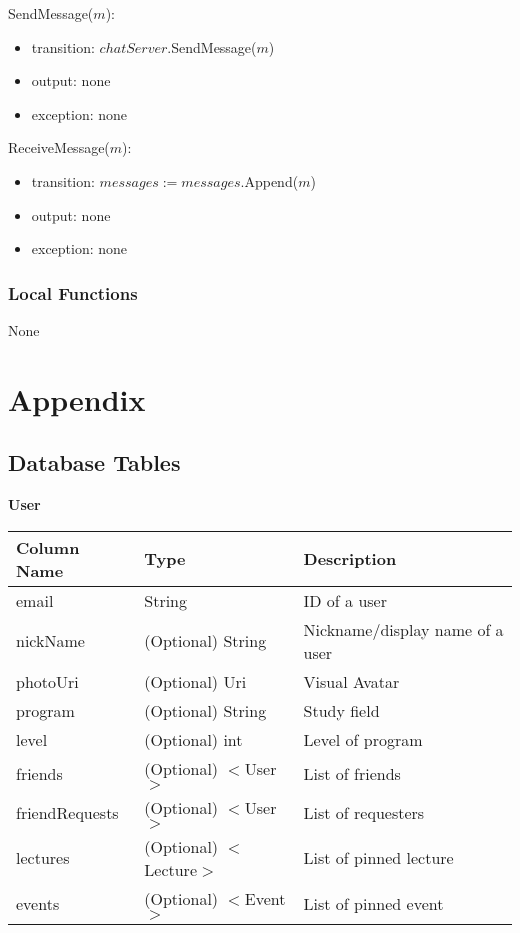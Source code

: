 \documentclass[12pt, titlepage]{article}
\begin{document}
\noindent SendMessage($m$):
\begin{itemize}
\item transition: $chatServer$.SendMessage($m$)
\item output: none
\item exception: none
\end{itemize}

\noindent ReceiveMessage($m$):
\begin{itemize}
\item transition: $messages := messages$.Append($m$)
\item output: none
\item exception: none
\end{itemize}

\subsubsection{Local Functions}

None

\newpage

\section{Appendix} \label{Appendix}
\subsection{Database Tables}

\quad \textbf{User}
\begin{table}[H]
	\begin{tabular}{|p{}|p{}|p{}|}
		\hline
		\textbf{Column Name} & \textbf{Type}  & \textbf{Description}                  \\
		\hline
		email                   & String                & ID of a user                        \\
		\hline
		nickName           & (Optional) String                & Nickname/display name of a user      \\
		\hline
		photoUri           & (Optional) Uri                & Visual Avatar       \\
		\hline
		program            & (Optional) String                & Study field                \\
		\hline
		level             & (Optional) int                & Level of program                 \\
		\hline
		friends          &  (Optional) $<$User$>$                & List of friends \\
		\hline
		friendRequests          &  (Optional) $<$User$>$                & List of requesters              \\
		\hline
		lectures                & (Optional) $<$Lecture$>$                & List of pinned lecture                     \\
		\hline
		events                & (Optional) $<$Event$>$                & List of pinned event                     \\			
		\hline
\end{tabular}
\end{table}
\end{document}
